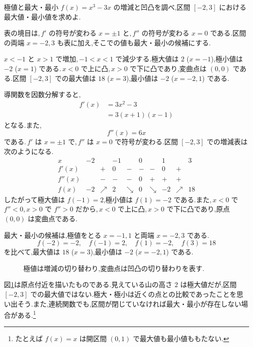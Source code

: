 \begin{example}{極値と最大・最小}
$f(x)=x^3-3x$ の増減と凹凸を調べ,区間 $[-2,3]$ における最大値・最小値を求めよ.
\end{example}
表の境目は,\,$f'$ の符号が変わる $x=\pm1$ と,\,$f''$ の符号が変わる $x=0$ である.区間の両端 $x=-2,3$ も表に加え,そこでの値も最大・最小の候補にする.

$x<-1$ と $x>1$ で増加,\,$-1<x<1$ で減少する.極大値は $2$ ($x=-1$),極小値は $-2$ ($x=1$) である.\,$x<0$ で上に凸,\,$x>0$ で下に凸であり,変曲点は $(0,0)$ である.区間 $[-2,3]$ での最大値は $18$ ($x=3$),最小値は $-2$ ($x=-2,1$) である.

導関数を因数分解すると,
\begin{align*}
 f'(x)&=3x^2-3\\
 &=3(x+1)(x-1)
\end{align*}
となる.また,
\[
 f''(x)=6x
\]
である.\,$f'$ は $x=\pm1$ で,\,$f''$ は $x=0$ で符号が変わる.区間 $[-2,3]$ での増減表は次のようになる.
\[
\begin{array}{c|ccccccccc}
 x&-2&&-1&&0&&1&&3\\ \hline
 f'(x)&&+&0&-&-&-&0&+&\\
 f''(x)&&-&-&-&0&+&+&+&\\
 f(x)&-2&\nearrow&2&\searrow&0&\searrow&-2&\nearrow&18
\end{array}
\]
したがって極大値は $f(-1)=2$,極小値は $f(1)=-2$ である.また,\,$x<0$ で $f''<0$,\,$x>0$ で $f''>0$ だから,\,$x<0$ で上に凸,\,$x>0$ で下に凸であり,原点 $(0,0)$ は変曲点である.

最大・最小の候補は,極値をとる $x=-1,1$ と両端 $x=-2,3$ である.
\[
 f(-2)=-2,\quad f(-1)=2,\quad f(1)=-2,\quad f(3)=18
\]
を比べて,最大値は $18$ ($x=3$),最小値は $-2$ ($x=-2,1$) である.

\begin{figure}[htbp]
\centering
{}
\caption{極値は増減の切り替わり,変曲点は凹凸の切り替わりを表す.}
\label{図:三次増減}
\end{figure}

図\ref{図:三次増減}は原点付近を描いたものである.見えている山の高さ $2$ は極大値だが,区間 $[-2,3]$ での最大値ではない.極大・極小は近くの点との比較であったことを思い出そう.また,連続関数でも,区間が閉じていなければ最大・最小が存在しない場合がある.\footnote{たとえば $f(x)=x$ は開区間 $(0,1)$ で最大値も最小値ももたない.}
